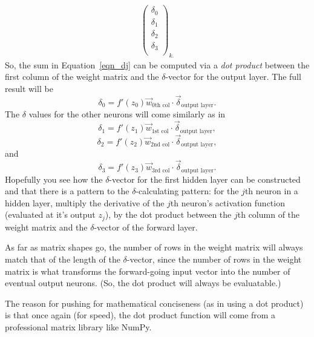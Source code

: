 \documentclass[12pt]{article}
\begin{document}
 \begin{align}
    \begin{pmatrix}
        \delta_0 \\
        \delta_1 \\
        \delta_2 \\
        \delta_3 \\
         \end{pmatrix}_{k.}
  \end{align}
 So, the sum in Equation~\ref{eqn_dj} can be computed via a \emph{dot product} between the first column of the weight matrix and the $\delta$-vector for the output layer. The full result will be
 \begin{equation}
 \delta_0=f'(z_0){\vec w_{\textrm{0th col}}}\cdot{\vec \delta_{\textrm{output layer}}}.
 \end{equation}
 The $\delta$ values for the other neurons will come similarly as in
 \begin{equation}
 \delta_1=f'(z_1){\vec w_{\textrm{1st col}}}\cdot{\vec \delta_{\textrm{output layer}}},
 \end{equation}
  \begin{equation}
 \delta_2=f'(z_2){\vec w_{\textrm{2nd col}}}\cdot{\vec \delta_{\textrm{output layer}}},
 \end{equation}
 and
  \begin{equation}
 \delta_3=f'(z_3){\vec w_{\textrm{3rd col}}}\cdot{\vec \delta_{\textrm{output layer}}}.
 \end{equation}
 Hopefully you see how the $\delta$-vector for the first hidden layer can be constructed and that there is a pattern to the $\delta$-calculating pattern: for the $j$th neuron in a hidden layer, multiply the derivative of the $j$th neuron's activation function (evaluated at it's output $z_j$), by the dot product between the $j$th column of the weight matrix and the $\delta$-vector of the forward layer. 
 
 As far as matrix shapes go, the number of rows in the weight matrix will always match that of the length of the $\delta$-vector, since the number of rows in the weight matrix is what transforms the forward-going input vector into the number of eventual output neurons. (So, the dot product will always be evaluatable.)

 
The reason for pushing for mathematical conciseness (as in using a dot product) is that once again (for speed), the dot product function will come from a professional matrix library like NumPy.
\end{document}

